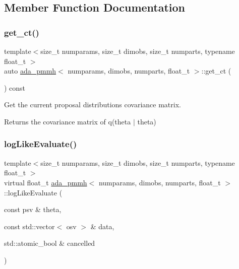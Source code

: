 \subsection{Member Function Documentation}
\mbox{\label{classada__pmmh_a1d496162b69f71e22a02ce7781a34228}} 
\subsubsection{\texorpdfstring{get\+\_\+ct()}{get\_ct()}}
{\footnotesize\ttfamily template$<$size\+\_\+t numparams, size\+\_\+t dimobs, size\+\_\+t numparts, typename float\+\_\+t $>$ \\
auto \hyperlink{classada__pmmh}{ada\+\_\+pmmh}$<$ numparams, dimobs, numparts, float\+\_\+t $>$\+::get\+\_\+ct (\begin{DoxyParamCaption}{ }\end{DoxyParamCaption}) const}



Get the current proposal distribution\textquotesingle{}s covariance matrix. 

\begin{DoxyReturn}{Returns}
the covariance matrix of q(theta\textquotesingle{} $\vert$ theta) 
\end{DoxyReturn}
\mbox{\label{classada__pmmh_ac6b216e8b940b9da7c835c91746cfc21}} 
\subsubsection{\texorpdfstring{log\+Like\+Evaluate()}{logLikeEvaluate()}}
{\footnotesize\ttfamily template$<$size\+\_\+t numparams, size\+\_\+t dimobs, size\+\_\+t numparts, typename float\+\_\+t $>$ \\
virtual float\+\_\+t \hyperlink{classada__pmmh}{ada\+\_\+pmmh}$<$ numparams, dimobs, numparts, float\+\_\+t $>$\+::log\+Like\+Evaluate (\begin{DoxyParamCaption}\item[{const psv \&}]{theta,  }\item[{const std\+::vector$<$ osv $>$ \&}]{data,  }\item[{std\+::atomic\+\_\+bool \&}]{cancelled }\end{DoxyParamCaption})\hspace{0.3cm}{\ttfamily [pure virtual]}}



